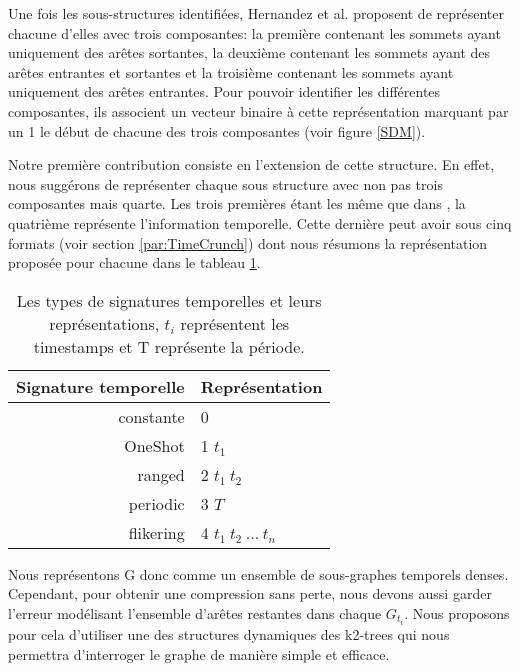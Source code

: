 			Une fois les sous-structures identifiées, Hernandez et al. \citep{hernandez2014compressed} proposent de représenter chacune d'elles avec trois composantes: la première contenant les sommets ayant uniquement des arêtes sortantes, la deuxième contenant les sommets ayant des arêtes entrantes et sortantes et la troisième contenant les sommets ayant uniquement des arêtes entrantes. Pour pouvoir identifier les différentes composantes, ils associent un vecteur binaire à cette représentation marquant par un 1 le début de chacune des trois composantes (voir figure \ref{SDM}).
			
			Notre première contribution consiste en l'extension de cette structure. En effet, nous suggérons de représenter chaque sous structure avec non pas trois composantes mais quarte. Les trois premières étant les même que dans \citep{hernandez2014compressed}, la quatrième représente l'information temporelle. Cette dernière peut avoir sous cinq formats (voir section \ref{par:TimeCrunch}) dont nous résumons la représentation proposée pour chacune dans le tableau \ref{tab:signtmp}.
			
			\begin{table}[h]
			\label{tab:signtmp}
			\begin{center}
			\begin{tabular}{|r|l|}
			\hline Signature temporelle & Représentation	
			\\\hline constante & 0	
			
			\\\hline OneShot & 1 $t_{1}$	
			
			\\\hline ranged & 2	$t_{1}\ t_{2}$	
			
			\\\hline periodic & 3  $T$	
			
			\\\hline flikering & 4 $t_{1}\ t_{2}\ ...\ t_{n}$	
			
			\\\hline			
			\end{tabular}
			\end{center}
			
			 \caption{\small {Les types de signatures temporelles et leurs représentations, $t_{i}$	 représentent les timestamps et T représente la période.}}
			\end{table}
			
			Nous représentons G donc comme un ensemble de sous-graphes temporels denses. Cependant, pour obtenir une compression sans perte, nous devons aussi garder l'erreur modélisant l'ensemble d'arêtes restantes dans chaque $G_{t_{i}}$. Nous proposons pour cela d'utiliser une des structures dynamiques des k2-trees qui nous permettra d'interroger le graphe de manière simple et efficace.
			
